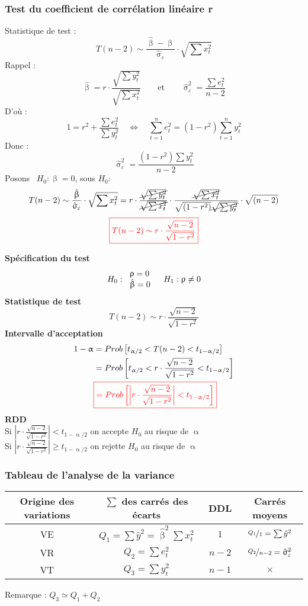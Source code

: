 \documentclass{article}
\newcommand{\hbeta}{\hat{\upbeta}}
\newcommand{\sumt}{\sum\limits_{t=1}^n}
\newcommand{\sige}{\hat{\upsigma}_\varepsilon^2}
\newcommand{\studn}{t_{\upalpha / 2}}
\newcommand{\studp}{t_{1 - \upalpha / 2}}
\begin{document}
\subsubsection{Test du coefficient de corrélation linéaire r}
Statistique de test  : 
\[T(n-2) \sim \frac{\hbeta - \upbeta }{\hat{\upsigma}_\varepsilon} \cdot \sqrt{\sum x_t^2}\]
Rappel : 
\[\hbeta = r \cdot \frac{\sqrt{\sum y_t^2}}{\sqrt{\sum x_t^2}} \qquad \textrm{et} \qquad \sige = \frac{\sum e_t^2}{n-2}\]
D'où : 
\[1 = r^2 + \frac{\sum e_t^2}{\sum y_t^2} \quad \Leftrightarrow \quad \sumt e_t^2 = (1- r^2) \sumt y_t^2 \]
Donc :
\[\sige = \frac{(1- r^2) \sum y_t^2}{n-2}\]
Posons \  $H_0 : \upbeta = 0$, sous $H_0 : $
\[T(n-2) \sim \frac{\hbeta}{\hat{\upsigma}_\varepsilon} \cdot \sqrt{\sum	 x_t^2} = r \cdot \frac{\cancel{\sqrt{\sum y_t^2}}}{\cancel{\sqrt{\sum x_t^2}}} \cdot \frac{\cancel{\sqrt{\sum x_t^2}}}{\sqrt{(1- r^2)} \cancel{\sqrt{\sum y_t^2}}} \cdot \sqrt{(n-2)} \]
\[{\color{red}\boxed{T(n-2) \sim r \cdot \frac{\sqrt{n-2}}{\sqrt{1-r^2}}}}\]

\textbf{Spécification du test}
\[H_0 : \begin{tabular}{l} $\uprho = 0$ \\ $\hbeta = 0$ \end{tabular} \quad H_1:  \uprho \neq 0\]
\textbf{Statistique de test}
\[T(n-2) \sim r \cdot \frac{\sqrt{n-2}}{\sqrt{1-r^2}}\]
\textbf{Intervalle d'acceptation}
\begin{align*}
	1- \upalpha &= Prob\left[\studn < T(n-2) < \studp\right] \\
	&= Prob\left[\studn< r \cdot \frac{\sqrt{n-2}}{\sqrt{1-r^2}} < \studp \right] \\
	&{\color{red}\boxed{= Prob\left[\left\lvert  r \cdot \frac{\sqrt{n-2}}{\sqrt{1-r^2}} \right\rvert < \studp\right]}}
\end{align*}
\textbf{RDD} \\
Si $ \left\lvert  r \cdot \frac{\sqrt{n-2}}{\sqrt{1-r^2}} \right\rvert < \studp $ on accepte $H_0$ au risque de $\upalpha$ \\
Si $\left\lvert  r \cdot \frac{\sqrt{n-2}}{\sqrt{1-r^2}} \right\rvert \geq \studp$ on rejette $H_0$ au risque de $\upalpha$

\subsubsection{Tableau de l'analyse de la variance}
\begin{center}
\begin{tabular}{| c | c | c | c |}
	\hline
	Origine des variations & $\sum$ des carrés des écarts & DDL & Carrés moyens\\
	\hline
	VE & $Q_1 = \sum \hat{y}^2 = \hbeta^2 \sum x_t^2$ & $1$ & $\nicefrac{Q_1}{1} = \sum \hat{y}^2 $\\
	\hline
	VR & $Q_2 = \sum e_t^2$ & $n-2$ & $\nicefrac{Q_2}{n-2} = \sige$ \\
	\hline
	VT & $Q_3 = \sum y_t^2$ & $n-1$ & $\times$ \\
	\hline
\end{tabular}
\end{center}
{\color{ForestGreen}Remarque : $Q_3 \simeq Q_1 +Q_2$}
\end{document}
